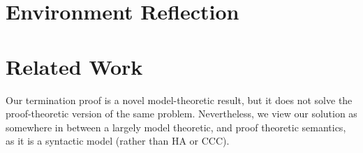 \documentclass{llncs}
\def\dfn{\mapsto}
\def\arr{\supset}
\def\marr{\rightarrow}
\newcommand{\turn}[1]{\vdash^\con{#1}}
\newcommand{\el}[1]{\llbracket ~ #1 ~ \rrbracket}
\newcommand{\con}[1]{\textmd{#1}}
\newcommand{\fun}[1]{\textmd{#1}}
\newcommand{\typm}[1]{\el{\Gamma \vdash #1}}
\newcommand{\dtypm}[1]{\el{\Delta \vdash #1}}
\newcommand{\typv}[1]{\Gamma \turn{V} #1}
\newcommand{\dtypv}[1]{\Delta \turn{V} #1}
\newcommand{\denv}[1]{\fun{Env}~#1~\Delta}
\begin{document}
\section{Environment Reflection}







\section{Related Work}

Our termination proof is a novel model-theoretic result, but it
does not solve the proof-theoretic version of the same problem.
Nevertheless, we view our solution as somewhere in between a largely
model theoretic, and proof theoretic semantics, as it is a syntactic
model (rather than HA or CCC).









\clearpage
\end{document}

